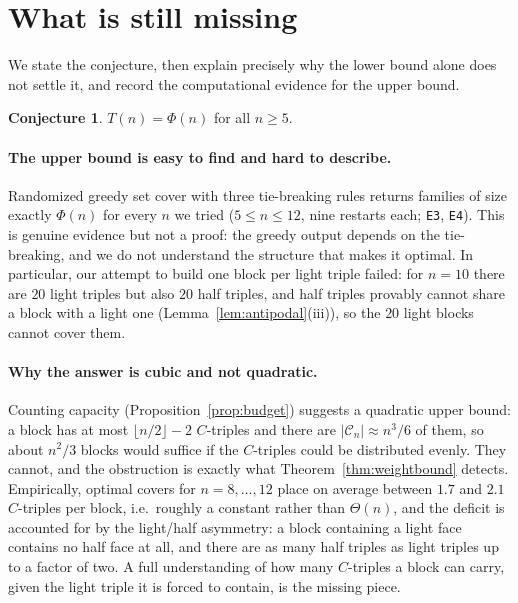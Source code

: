\documentclass[11pt,a4paper]{article}
\theoremstyle{definition}
\newtheorem{conjecture}[theorem]{Conjecture}
\begin{document}
\section{What is still missing}\label{sec:gap}

We state the conjecture, then explain precisely why the lower bound alone does
not settle it, and record the computational evidence for the upper bound.

\begin{conjecture}\label{conj:main}
$T(n) = \Phi(n)$ for all $n \ge 5$.
\end{conjecture}

\paragraph{The upper bound is easy to find and hard to describe.}
Randomized greedy set cover with three tie-breaking rules returns families of
size exactly $\Phi(n)$ for every $n$ we tried ($5 \le n \le 12$, nine restarts
each; \texttt{E3}, \texttt{E4}). This is genuine evidence but not a proof: the
greedy output depends on the tie-breaking, and we do not understand the
structure that makes it optimal. In particular, our attempt to build one block
per light triple failed: for $n = 10$ there are $20$ light triples but also $20$
half triples, and half triples provably cannot share a block with a light one
(Lemma~\ref{lem:antipodal}(iii)), so the $20$ light blocks cannot cover them.

\paragraph{Why the answer is cubic and not quadratic.} Counting capacity
(Proposition~\ref{prop:budget}) suggests a quadratic upper bound: a block has at
most $\lfloor n/2 \rfloor - 2$ $C$-triples and there are $|\mathcal{C}_n| \approx
n^3/6$ of them, so about $n^2/3$ blocks would suffice if the $C$-triples could be
distributed evenly. They cannot, and the obstruction is exactly what
Theorem~\ref{thm:weightbound} detects. Empirically, optimal covers for
$n = 8, \dots, 12$ place on average between $1.7$ and $2.1$ $C$-triples per
block, i.e.\ roughly a constant rather than $\Theta(n)$, and the deficit is
accounted for by the light/half asymmetry: a block containing a light face
contains no half face at all, and there are as many half triples as light
triples up to a factor of two. A full understanding of how many $C$-triples a
block can carry, given the light triple it is forced to contain, is the missing
piece.
\end{document}
